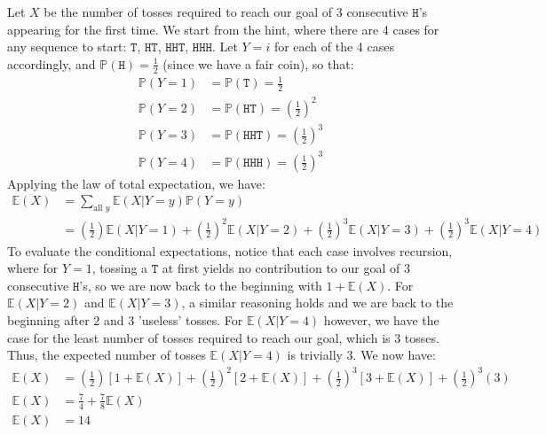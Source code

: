 \documentclass[12pt]{article}
\begin{document}
Let $X$ be the number of tosses required to reach our goal of 3 consecutive $\mathtt{H}$'s appearing for the first time. We start from the hint, where there are 4 cases for any sequence to start: $ \mathtt{T}$, $ \mathtt{HT}$, $ \mathtt{HHT}$, $ \mathtt{HHH}$. Let $Y = i$ for each of the 4 cases accordingly, and $ \mathbb{P}(\mathtt{H}) = \frac{1}{2}$ (since we have a fair coin), so that: \begin{align*}
    \mathbb{P}(Y = 1) &= \mathbb{P}(\mathtt{T}) = \frac{1}{2} \\ 
    \mathbb{P}(Y = 2) &= \mathbb{P}(\mathtt{HT}) = \left( \frac{1}{2} \right)^{2} \\ 
    \mathbb{P}(Y = 3) &= \mathbb{P}(\mathtt{HHT}) = \left( \frac{1}{2} \right)^{3} \\ 
    \mathbb{P}(Y = 4) &= \mathbb{P}(\mathtt{HHH}) = \left( \frac{1}{2} \right)^{3} 
\end{align*} Applying the law of total expectation, we have: \begin{align*}
    \mathbb{E}(X) &= \sum_{\text{all } y} \mathbb{E}(X | Y = y) \mathbb{P}(Y = y) \\ 
    &= \left(\frac{1}{2}\right) \mathbb{E}(X | Y = 1) + \left( \frac{1}{2} \right)^{2} \mathbb{E}(X | Y = 2) + \left( \frac{1}{2} \right)^{3} \mathbb{E}(X | Y = 3) + \left( \frac{1}{2} \right)^{3} \mathbb{E}(X | Y = 4)
\end{align*} To evaluate the conditional expectations, notice that each case involves recursion, where for $Y = 1$, tossing a $\mathtt{T}$ at first yields no contribution to our goal of 3 consecutive $\mathtt{H}$'s, so we are now back to the beginning with $1 + \mathbb{E}(X)$. For $ \mathbb{E}(X | Y = 2)$ and $ \mathbb{E}(X | Y = 3)$, a similar reasoning holds and we are back to the beginning after $2$ and $3$ 'useless' tosses. For $ \mathbb{E}(X | Y = 4)$ however, we have the case for the least number of tosses required to reach our goal, which is 3 tosses. Thus, the expected number of tosses $ \mathbb{E}(X | Y = 4)$ is trivially 3. We now have: \begin{align*}
    \mathbb{E}(X) &= \left( \frac{1}{2} \right) \left[ 1 + \mathbb{E}(X) \right] + \left( \frac{1}{2} \right)^{2} \left[ 2 + \mathbb{E}(X) \right] + \left( \frac{1}{2} \right)^{3} \left[ 3 + \mathbb{E}(X) \right] + \left( \frac{1}{2} \right)^{3}(3) \\ 
    \mathbb{E}(X) &= \frac{7}{4} + \frac{7}{8} \mathbb{E}(X) \\ 
    \mathbb{E}(X) &= \boxed{14}
\end{align*}
\end{document}
